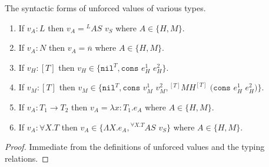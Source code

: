 \begin{lemma}

\label{cf}

The syntactic forms of unforced values of various types.

\begin{enumerate}

\item If $v_{A}:L$ then $v_{A}={^{L}A}S$ $v_{S}$ where $A\in\lbrace H,M\rbrace$.

\item If $v_{A}:N$ then $v_{A}=\overline{n}$ where $A\in\lbrace H,M\rbrace$.

\item If $v_{H}:[T]$ then $v_{H}\in\lbrace\mathtt{nil}^{T},\mathtt{cons}$ $e_{H}^{1}$ $e_{H}^{2}\rbrace$.

\item If $v_{M}:[T]$ then $v_{M}\in\lbrace\mathtt{nil}^{T},\mathtt{cons}$ $v_{M}^{1}$ $v_{M}^{2},{^{[T]}M}H^{[T]}$ $(\mathtt{cons}$ $e_{H}^{1}$ $e_{H}^{2})\rbrace$.

\item If $v_{A}:T_{1}\rightarrow T_{2}$ then $v_{A}=\lambda x:T_{1}.e_{A}$ where $A\in\lbrace H,M\rbrace$.

\item If $v_{A}:\forall X.T$ then $v_{A}\in\lbrace\Lambda X.e_{A},{^{\forall X.T}A}S$ $v_{S}\rbrace$ where $A\in\lbrace H,M\rbrace$.

\end{enumerate}

\begin{proof}

Immediate from the definitions of unforced values and the typing relations.

\end{proof}

\end{lemma}